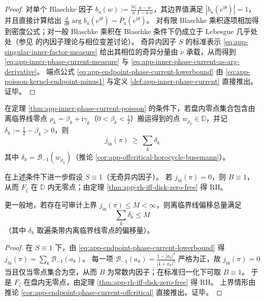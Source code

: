 \begin{proof}
对单个 Blaschke 因子 \(b_a(w):=\frac{|a|}{a}\frac{a-w}{1-\overline a\,w}\)，其边界值满足 \(|b_a(e^{\mathrm{i}\theta})|=1\)，并且直接计算给出
\(
\frac{d}{d\theta}\arg b_a(e^{\mathrm{i}\theta})=P_a(e^{\mathrm{i}\theta})
\)。
对有限 Blaschke 乘积逐项相加得到密度公式；对一般 Blaschke 乘积在 Blaschke 条件下仍成立于 Lebesgue 几乎处处（参见 \cite{Duren1970TheoryHp,Garnett2007BoundedAnalyticFunctions} 的内因子理论与相位变差讨论）。
奇异内因子 \(S\) 的标准表示 \eqref{eq:app-singular-inner-factor-measure} 给出其相位的奇异分量由 \(\nu\) 承载，从而得到 \eqref{eq:app-inner-phase-current-measure} 与 \eqref{eq:app-inner-phase-current-as-arg-derivative}。
端点公式 \eqref{eq:app-endpoint-phase-current-lowerbound} 由 \eqref{eq:app-poisson-kernel-endpoint-minus1} 与定义 \ref{def:app-inner-phase-current} 直接推出。证毕。
\end{proof}

\begin{corollary}[离临界线偏移的端点相位下界]\label{cor:app-endpoint-phase-current-offcritical}
在定理 \ref{thm:app-inner-phase-current-poisson} 的条件下，若盘内零点集合包含由离临界线零点 \(\rho_k=\beta_k+\mathrm{i}\gamma_k\)（\(0<\beta_k<\tfrac12\)）搬运得到的点 \(w_{\rho_k}\in\mathbb{D}\)，并记 \(\delta_k:=\tfrac12-\beta_k>0\)，则
\[
\boxed{\;
j_{\mathrm{in}}(\pi)\ \ge\ \sum_k \delta_k\;}
\]
其中 \(\delta_k=\mathcal{B}_{-1}(w_{\rho_k})\)（推论 \ref{cor:app-offcritical-horocycle-busemann}）。
\end{corollary}

\begin{corollary}[端点相位证书]\label{cor:app-endpoint-phase-certificate}
在上述条件下进一步假设 \(S\equiv 1\)（无奇异内因子）。
若 \(j_{\mathrm{in}}(\pi)=0\)，则 \(B\equiv 1\)，从而 \(F_{\zeta}\) 在 \(\mathbb{D}\) 内无零点；由定理 \ref{thm:app-rh-iff-disk-zero-free} 得 RH。
\par
更一般地，若存在可审计上界 \(j_{\mathrm{in}}(\pi)\le M<\infty\)，则离临界线偏移总量满足
\[
\boxed{\;\sum_k \delta_k\le M\;}
\]
（其中 \(\delta_k\) 取遍条带内离临界线零点的偏移量）。
\end{corollary}

\begin{proof}
在 \(S\equiv 1\) 下，由 \eqref{eq:app-endpoint-phase-current-lowerbound} 得 \(j_{\mathrm{in}}(\pi)=\sum_k \mathcal{B}_{-1}(a_k)\)。
每一项 \(\mathcal{B}_{-1}(a_k)=\frac{1-|a_k|^2}{|1+a_k|^2}\) 严格为正，故 \(j_{\mathrm{in}}(\pi)=0\) 当且仅当零点集合为空，从而 \(B\) 为常数内因子；在标准归一化下可取 \(B\equiv 1\)。
于是 \(F_{\zeta}\) 在盘内无零点，由定理 \ref{thm:app-rh-iff-disk-zero-free} 得 RH。
上界情形由推论 \ref{cor:app-endpoint-phase-current-offcritical} 直接推出。证毕。
\end{proof}

